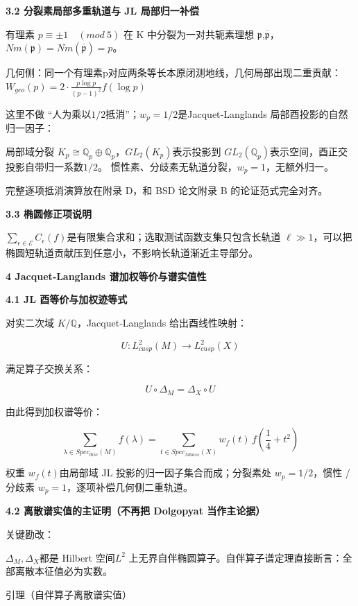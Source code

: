 \documentclass[11pt,a4paper]{ctexart}
\begin{document}
\textbf{3.2 分裂素局部多重轨道与 JL 局部归一补偿}

有理素 \(p \equiv \pm 1\quad(mod\ 5)\) 在 K 中分裂为一对共轭素理想
\(\mathfrak{p}\),\(\overline{\mathfrak{p}}\)，\(Nm\left( \mathfrak{p} \right) = Nm\left( \overline{\mathfrak{p}} \right) = p\)。

几何侧：同一个有理素p对应两条等长本原闭测地线，几何局部出现二重贡献：
\(W_{geo}(p) = 2 \cdot \frac{p\log p}{(p - 1)^{2}}f\left( \log p \right)\)

这里不做 ``人为乘以\(1/2\)抵消''；\(w_{p} = 1/2\)是Jacquet‑Langlands
局部酉投影的自然归一因子：

局部域分裂
\(K_{p} \cong \mathbb{Q}_{p} \oplus \mathbb{Q}_{p}\)，\({GL}_{2}\left( K_{p} \right)\)表示投影到
\({GL}_{2}\left( \mathbb{Q}_{p} \right)\)表示空间，酉正交投影自带归一系数\(1/2\)。
惯性素、分歧素无轨道分裂，\(w_{p} = 1\)，无额外归一。

完整逐项抵消演算放在附录 D，和 BSD 论文附录 B 的论证范式完全对齐。

\textbf{3.3 椭圆修正项说明}

\(\sum_{\epsilon \in \mathcal{E}}^{}C_{\epsilon}(f)\)是有限集合求和；选取测试函数支集只包含长轨道
\(\ell{\gg}1\)，可以把椭圆短轨道贡献压到任意小，不影响长轨道渐近主导部分。

\textbf{4 Jacquet‑Langlands 谱加权等价与谱实值性}

\textbf{4.1 JL 酉等价与加权迹等式}

对实二次域 \(K\mathbb{/Q}\)，Jacquet‑Langlands 给出酉线性映射：

\[U:L_{cusp}^{2}(M) \rightarrow L_{cusp}^{2}(X)\]

满足算子交换关系：

\[U \circ \Delta_{M} = \Delta_{X} \circ U\]

由此得到加权谱等价：

\[\sum_{\lambda \in Spec_{disc}(M)}^{}f(\lambda) = \sum_{t \in Spec_{Maass}(X)}^{}w_{f}(t)\, f\left( \frac{1}{4} + t^{2} \right)\]

权重 \(w_{f}(t)\)由局部域 JL 投影的归一因子集合而成；分裂素处
\(w_{p} = 1/2\)，惯性 / 分歧素 \(w_{p} = 1\)，逐项补偿几何侧二重轨道。

\textbf{4.2 离散谱实值的主证明（不再把 Dolgopyat 当作主论据）}

关键勘改：

\(\Delta_{M},\Delta_{X}\)都是 Hilbert 空间\(L^{2}\)
上无界自伴椭圆算子。自伴算子谱定理直接断言：全部离散本征值必为实数。

引理（自伴算子离散谱实值）
\end{document}
